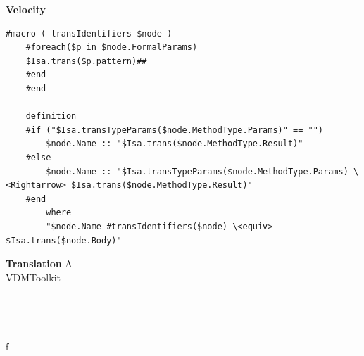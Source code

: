 	\hfill\break
	\textbf{Velocity}
	\begin{lstlisting}[language=Velocity]
	#macro ( transIdentifiers $node )
	#foreach($p in $node.FormalParams)
	$Isa.trans($p.pattern)##
	#end
	#end

	definition
	#if ("$Isa.transTypeParams($node.MethodType.Params)" == "")
		$node.Name :: "$Isa.trans($node.MethodType.Result)"
	#else
		$node.Name :: "$Isa.transTypeParams($node.MethodType.Params) \<Rightarrow> $Isa.trans($node.MethodType.Result)"
	#end
	    where
	    "$node.Name #transIdentifiers($node) \<equiv> $Isa.trans($node.Body)"
	\end{lstlisting} 

	\textbf{Translation}
	\hfill\break
	\hfill\break
	\pagecolor{bgcolor}
	\ttfamily
	\syntaxNULL{}A\hspace*{\fill}\\
	VDMToolkit\hspace*{\fill}\\
	\hspace*{\fill}\\
	\hspace*{\fill}\\
	\hspace*{\fill}\\
	\hspace*{\fill}\\
	f{\ }\syntaxOPERATOR{::}{\ }\hspace*{\fill}\\
	\syntaxLITERALA{{\ }{\ }}\syntaxLITERALA{{\ }{\ }}\syntaxLITERALA{{\ }}\syntaxLITERALA{\usebox{\backslashbox}}\syntaxLITERALA{\usebox{\lessthan}}\syntaxLITERALA{\usebox{\greaterthan}}\syntaxLITERALA{{\ }}\hspace*{\fill}\\
	\syntaxLITERALA{{\ }{\ }}\syntaxLITERALA{{\ }{\ }}\syntaxLITERALA{{\ }}\syntaxLITERALA{\usebox{\backslashbox}}\syntaxLITERALA{\usebox{\lessthan}}\syntaxLITERALA{\usebox{\greaterthan}}\syntaxLITERALA{{\ }}\hspace*{\fill}\\
